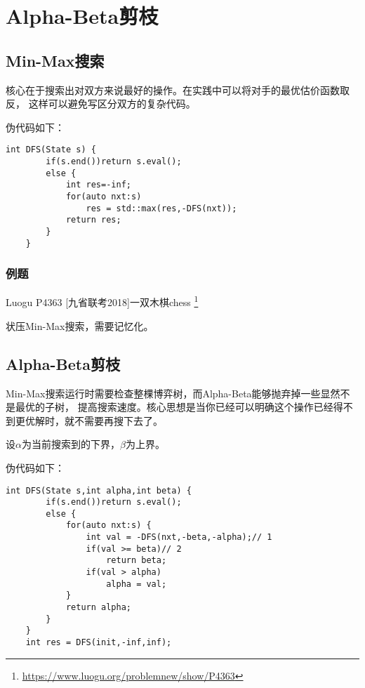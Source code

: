\section{Alpha-Beta剪枝}
\subsection{Min-Max搜索}

核心在于搜索出对双方来说最好的操作。在实践中可以将对手的最优估价函数取反，
这样可以避免写区分双方的复杂代码。

伪代码如下：
\begin{lstlisting}[title=Min-Max Search]
    int DFS(State s) {
        if(s.end())return s.eval();
        else {
            int res=-inf;
            for(auto nxt:s)
                res = std::max(res,-DFS(nxt));
            return res;
        }
    }
\end{lstlisting}

\subsubsection{例题}
Luogu P4363 [九省联考2018]一双木棋chess
\footnote{\url{https://www.luogu.org/problemnew/show/P4363}}

状压Min-Max搜索，需要记忆化。



\subsection{Alpha-Beta剪枝}


Min-Max搜索运行时需要检查整棵博弈树，而Alpha-Beta能够抛弃掉一些显然不是最优的子树，
提高搜索速度。核心思想是当你已经可以明确这个操作已经得不到更优解时，就不需要再搜下去了。

设$\alpha$为当前搜索到的下界，$\beta$为上界。

伪代码如下：
\begin{lstlisting}[title=Alpha-Beta 剪枝]
    int DFS(State s,int alpha,int beta) {
        if(s.end())return s.eval();
        else {
            for(auto nxt:s) {
                int val = -DFS(nxt,-beta,-alpha);// 1
                if(val >= beta)// 2
                    return beta;
                if(val > alpha)
                    alpha = val;
            }
            return alpha;
        }
    }
    int res = DFS(init,-inf,inf);
\end{lstlisting}

